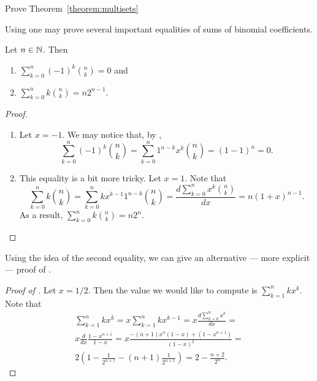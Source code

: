 \begin{exercise}
  Prove Theorem~\ref{theorem:multisets}
\end{exercise}

Using  one may prove several important equalities of sums
of binomial coefficients.
\begin{corollary}
\label{corollary:binommials-equality}
  Let $n \in {\mathbb{N}}$. Then
  \begin{enumerate}
    \item $\sum_{k = 0}^n (-1)^k \binom{n}{k} = 0$ and
    \item $\sum_{k = 0}^n k \binom{n}{k} = n 2^{n - 1}$.
  \end{enumerate}
\end{corollary}
\begin{proof}
  \begin{enumerate}
    \item Let $x = -1$. We may notice that, by , 
      \[
        \sum_{k = 0}^n (-1)^k \binom{n}{k} = 
        \sum_{k = 0}^n 1^{n - k} x^k \binom{n}{k} = (1 - 1)^n = 0.
      \]
    \item This equality is a bit more tricky. Let $x = 1$. Note that
      \[
        \sum_{k = 0}^n k \binom{n}{k} = 
	\sum_{k = 0}^n k x^{k - 1} 1^{n - k} \binom{n}{k} =
        \frac{d \sum_{k = 0}^n x^k \binom{n}{k}}{dx} = n (1 + x)^{n - 1}.
      \]
      As a result, $\sum_{k = 0}^n k \binom{n}{k} = n 2^n$.
  \end{enumerate}
\end{proof}


Using the idea of the second equality, we can give an alternative --- more
explicit --- proof of .
\begin{proof}[Proof of ]
\label{proof-claim:guess-one-out-of-many}
  Let $x = 1 / 2$. Then the value we would like to compute is 
  $\sum_{k = 1}^n k x^k$. Note that
  \begin{multline*}
    \sum_{k = 1}^n k x^k = x \sum_{k = 1}^n k x^{k - 1} =
    x \frac{d \sum_{k = 0}^n x^k}{dx} = \\
    x \frac{d}{dx} \frac{1 - x^{n + 1}}{1 - x} = 
    x \frac{-(n + 1) x^n (1 - x) + (1 - x^{n + 1})}{(1 - x)^2} =  \\
    2\left(
      1 - \frac{1}{2^{n + 1}} - (n + 1) \frac{1}{2^{n + 1}}
    \right) = 2 - \frac{n + 2}{2^n}.
  \end{multline*}
\end{proof}

